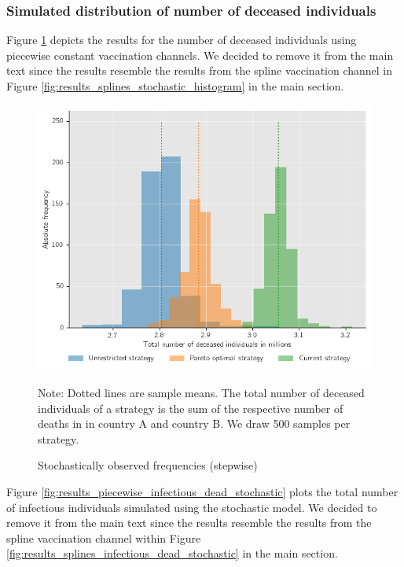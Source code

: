 





\clearpage
\subsubsection{Simulated distribution of number of deceased individuals}
\label{A:simulated_distr}

Figure \ref{fig:results_piecewise_stochastic_histogram} depicts the results for the number of deceased individuals using piecewise constant vaccination channels. We decided to remove it from the main text since the results resemble the results from the spline vaccination channel in Figure \ref{fig:results_splines_stochastic_histogram} in the main section.
\begin{figure}[h!]
\centering
\includegraphics[scale=0.65]{images/piecewise_stochastic_histogram.png}\\
\begin{flushleft}
\scriptsize{Note:} Dotted lines are sample means. The total number of deceased individuals of a strategy is the sum of the respective number of deaths in in country A and country B. We draw 500 samples per strategy. 
\end{flushleft}
\caption{Stochastically observed frequencies (stepwise)}
\label{fig:results_piecewise_stochastic_histogram}
\end{figure}

Figure \ref{fig:results_piecewise_infectious_dead_stochastic} plots the total number of infectious individuals simulated using the stochastic model. We decided to remove it from the main text since the results resemble the results from the spline vaccination channel within Figure \ref{fig:results_splines_infectious_dead_stochastic} in the main section.\\

